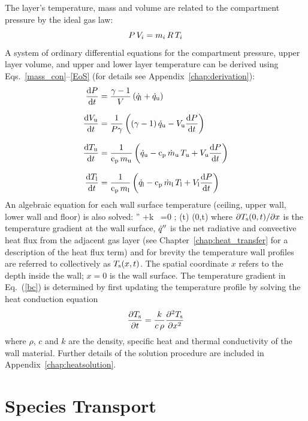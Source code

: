\documentclass[12pt,twoside]{book}
\begin{document}
The layer's temperature, mass and volume are related to the compartment pressure by the ideal gas law:
\begin{equation}
  P\,V\sb{i} = m\sb{i}\,R \, T\sb{i} \label{EoS}
\end{equation}
A system of ordinary differential equations for the compartment pressure, upper layer volume, and upper and lower layer temperature can be derived using Eqs.~\ref{mass_con}--\ref{EoS} (for details see Appendix~\ref{chap:derivation}):
\begin{align}
\frac{\mathrm{d} {P}}{\mathrm{d} t} &= \frac{{\gamma-1}}{{V}} \left( \dot{q}\sb{\mathrm{l}} + \dot{q}\sb{\mathrm{u}} \right)  \label{eq1} \\[.1in]
\frac{\mathrm{d} {V\sb{\mathrm{u}}}}{\mathrm{d} t} &= \frac{1}{P \gamma} \left( (\gamma-1) \, \dot{q}\sb{\mathrm{u}} - V\sb{\mathrm{u}} \frac{\mathrm{d} {P}}{\mathrm{d} t} \right) \label{eq2} \\[.1in]
\frac{\mathrm{d} {T\sb{\mathrm{u}}}}{\mathrm{d} t} &= \frac{1}{{\mathrm{c}}\sb{\mathrm{p}} \, m_{\mathrm{u}}} \left( \dot{q}\sb{\mathrm{u}} - {\mathrm{c}}\sb{\mathrm{p}} \, \dot{m}\sb{\mathrm{u}} \, T\sb{\mathrm{u}} + V\sb{\mathrm{u}} \frac{\mathrm{d} {P}}{\mathrm{d} t} \right) \label{eq3} \\[.1in]
\frac{\mathrm{d} {T\sb{\mathrm{l}}}}{\mathrm{d} t} &= \frac{1}{{\mathrm{c}}\sb{\mathrm{p}} \, m_{\mathrm{l}}} \left( \dot{q}\sb{\mathrm{l}} - {\mathrm{c}}\sb{\mathrm{p}} \, \dot{m}\sb{\mathrm{l}} \, T\sb{\mathrm{l}} + V\sb{\mathrm{l}} \frac{\mathrm{d} {P}}{\mathrm{d} t} \right) \label{eq4}
\end{align}
An algebraic equation for each wall surface temperature (ceiling, upper wall, lower wall and floor) is also solved:
\be
   \dq'' +k \, =0   \quad ; \quad  \Tw(t) \equiv \Ts(0,t) \label{bc}
\ee
where $\partial T\sb{\mathrm{s}}(0,t)/\partial x$ is the temperature gradient at the wall surface, $\dot{q}''$ is the net radiative and convective heat flux from the adjacent gas layer (see Chapter~\ref{chap:heat_transfer} for a description of the heat flux term) and for brevity the temperature wall profiles are referred to collectively as $T\sb{\mathrm{s}}(x,t)$. The spatial coordinate $x$ refers to the depth inside the wall; $x=0$ is the wall surface. The temperature gradient in Eq.~(\ref{bc}) is determined by first updating the temperature profile by solving the heat conduction equation
\begin{equation}
   \frac{\partial T\sb{\mathrm{s}}}{\partial t} = \frac{k}{c \, \rho} \frac{\partial^2 T\sb{\mathrm{s}}}{\partial x^2}
\end{equation}
where $\rho$, $c$ and $k$ are the density, specific heat and thermal conductivity of the wall material. Further details of the solution procedure are included in Appendix~\ref{chap:heatsolution}.






\section{Species Transport}
\end{document}
